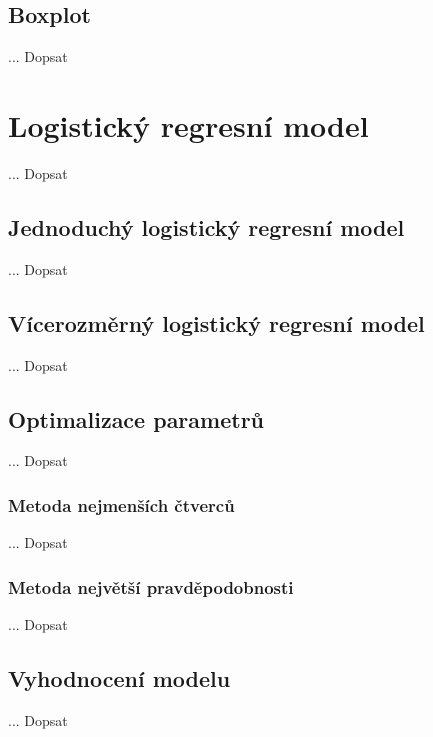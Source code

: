 \subsection{Boxplot}
... Dopsat

\newpage

\section{Logistický regresní model}
... Dopsat

\subsection{Jednoduchý logistický regresní model}
... Dopsat

\subsection{Vícerozměrný logistický regresní model}
... Dopsat

\subsection{Optimalizace parametrů}
... Dopsat

\subsubsection{Metoda nejmenších čtverců}
... Dopsat

\subsubsection{Metoda největší pravděpodobnosti}
... Dopsat

\subsection{Vyhodnocení modelu}
... Dopsat
